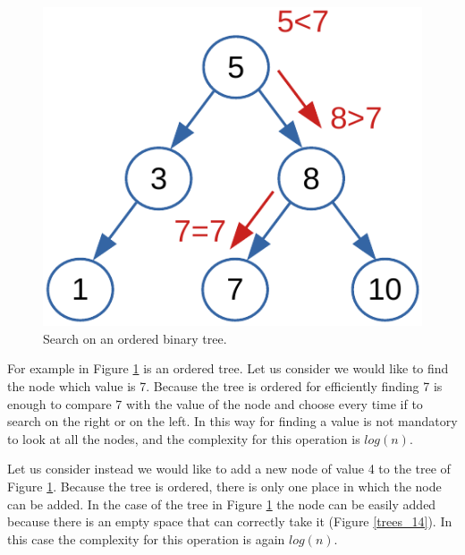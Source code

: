 \begin{figure}[H]
	\begin{center}
		\includegraphics[scale=.6]{chapters/trees/images/trees_13.pdf}
		\caption[Search on an ordered binary tree.]{Search on an ordered binary tree.}
		\label{trees_13}
	\end{center}
\end{figure}

For example in Figure \ref{trees_13} is an ordered tree. Let us consider we would like to find the node which value is 7. Because the tree is ordered for efficiently finding 7 is enough to compare 7 with the value of the node and choose every time if to search on the right or on the left. In this way for finding a value is not mandatory to look at all the nodes, and the complexity for this operation is \(log(n)\).

Let us consider instead we would like to add a new node of value 4 to the tree of Figure \ref{trees_13}. Because the tree is ordered, there is only one place in which the node can be added. In the case of the tree in Figure \ref{trees_13} the node can be easily added because there is an empty space that can correctly take it (Figure \ref{trees_14}). In this case the complexity for this operation is again \(log(n)\).

